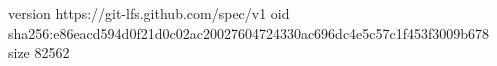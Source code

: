 version https://git-lfs.github.com/spec/v1
oid sha256:e86eacd594d0f21d0c02ac20027604724330ac696dc4e5c57c1f453f3009b678
size 82562
